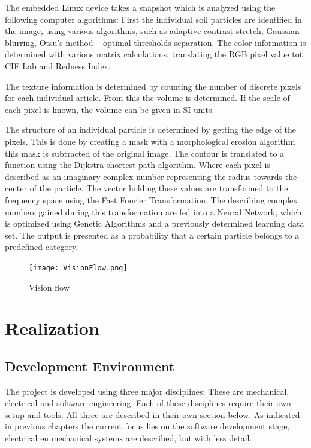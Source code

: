 \documentclass[11pt,fleqn,,a4paper,twoside,openright]{book}
\begin{document}
The embedded Linux device takes a snapshot which is analyzed using the following computer algorithms: First the individual soil particles are identified in the image, using various algorithms, such as adaptive contrast stretch, Gaussian blurring, Otsu's method – optimal thresholds separation. The color information is determined with various matrix calculations, translating the RGB pixel value tot CIE Lab and Redness Index.

The texture information is determined by counting the number of discrete pixels for each individual article. From this the volume is determined. If the scale of each pixel is known, the volume can be given in SI units.

The structure of an individual particle is determined by getting the edge of the pixels. This is done by creating a mask with a morphological erosion algorithm this mask is subtracted of the original image. The contour is translated to a function using the Dijkstra shortest path algorithm. Where each pixel is described as an imaginary complex number representing the radius towards the center of the particle. The vector holding these values are transformed to the frequency space using the Fast Fourier Transformation. The describing complex numbers gained during this transformation are fed into a Neural Network, which is optimized using Genetic Algorithms and a previously determined learning data set. The output is presented as a probability that a certain particle belongs to a predefined category.
\newpage
\begin{figure}[h]
	\centering
	\texttt{[image: VisionFlow.png]}
	\caption{Vision flow}\label{fig:Visionflow}
\end{figure}

\part{Realization}\label{part:Realization}

\chapter{Development Environment}\label{chap:DevelopmentEnvironment}
The project is developed using three major disciplines; These are mechanical, electrical and software engineering. Each of these disciplines require their own setup and tools. All three are described in their own section below. As indicated in previous chapters the current focus lies on the software development stage, electrical en mechanical systems are described, but with less detail.
\end{document}

